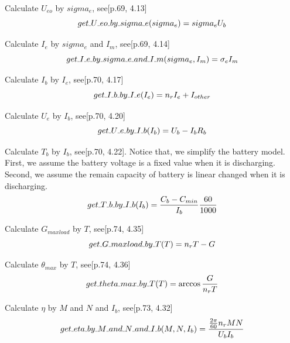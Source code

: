 \documentclass{article} %
\numberwithin{equation}{section} %
\newcommand{\SL}{\rule{.3em}{.3pt}} %
\begin{document}
Calculate $U_{eo}$ by $sigma_e$, see\cite{qq}[p.69, 4.13]
\begin{equation}
get\SL U\SL eo\SL by\SL sigma\SL e (sigma_e) = sigma_e U_b \label{basic.get_U_eo_by_sigma_e}
\end{equation}

Calculate $I_e$ by $sigma_e$ and $I_m$, see\cite{qq}[p.69, 4.14]
\begin{equation}
get\SL I\SL e\SL by\SL sigma\SL e\SL and\SL I\SL m (sigma_e, I_m) = \sigma_e I_m \label{basic.get_I_e_by_sigma_e_and_I_m}
\end{equation}

Calculate $I_b$ by $I_e$, see\cite{qq}[p.70, 4.17]
\begin{equation}
get\SL I\SL b\SL by\SL I\SL e (I_e) = n_r I_e + I_{other} \label{basic.get_I_b_by_I_e}
\end{equation}

Calculate $U_e$ by $I_b$, see\cite{qq}[p.70, 4.20]
\begin{equation}
get\SL U\SL e\SL by\SL I\SL b (I_b) = U_b - I_b R_b \label{basic.get_U_e_by_I_b}
\end{equation}

Calculate $T_b$ by $I_b$, see\cite{qq}[p.70, 4.22]. 
Notice that, we simplify the battery model. 
First, we assume the battery voltage is a fixed value when it is discharging.
Second, we assume the remain capacity of battery is linear changed when it is discharging.
\begin{equation}
get\SL T\SL b\SL by\SL I\SL b (I_b) = \frac{C_b-C_{min}}{I_b} \frac{60}{1000} \label{basic.get_T_b_by_I_b}
\end{equation}

Calculate $G_{maxload}$ by $T$, see\cite{qq}[p.74, 4.35]
\begin{equation}
get\SL G\SL maxload\SL by\SL T (T) = n_r T - G \label{basic.get_G_maxload_by_T}
\end{equation}

Calculate $\theta_{max}$ by $T$, see\cite{qq}[p.74, 4.36]
\begin{equation}
get\SL theta\SL max\SL by\SL T (T) = \arccos{\frac{G}{n_r T}} \label{basic.get_theta_max_by_T}
\end{equation}

Calculate $\eta$ by $M$ and $N$ and $I_b$, see\cite{qq}[p.73, 4.32]
\begin{equation}
get\SL eta\SL by\SL M\SL and\SL N\SL and\SL I\SL b (M, N, I_b) = \frac{\frac{2\pi}{60} n_r M N}{U_b I_b} \label{basic.get_eta_by_M_and_N_and_I_b}
\end{equation}
\end{document}
